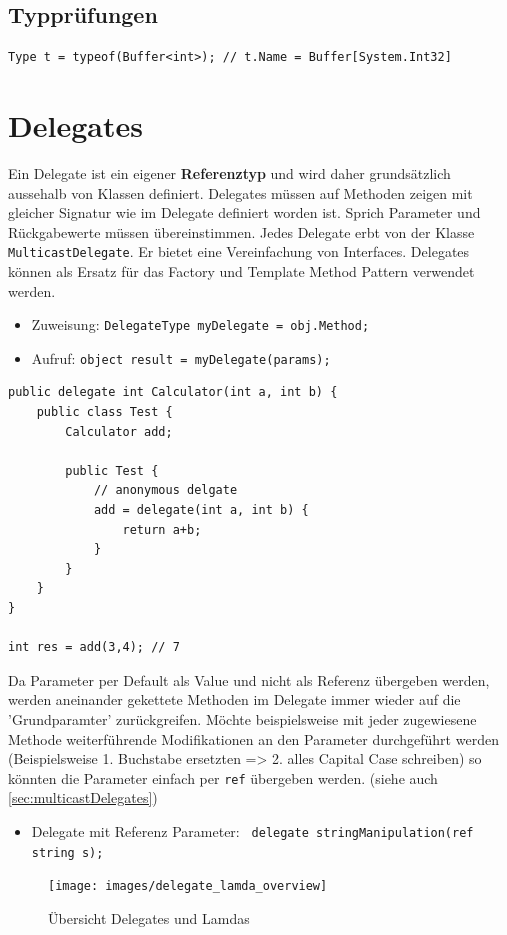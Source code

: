 \subsection{Typprüfungen}
\begin{lstlisting}
Type t = typeof(Buffer<int>); // t.Name = Buffer[System.Int32]
\end{lstlisting}


\section{Delegates}
Ein Delegate ist ein eigener \textbf{Referenztyp} und wird daher grundsätzlich aussehalb von Klassen definiert. Delegates müssen auf Methoden zeigen mit gleicher Signatur wie im Delegate definiert worden ist. Sprich Parameter und Rückgabewerte müssen übereinstimmen. Jedes Delegate erbt von der Klasse \lstinline|MulticastDelegate|. Er bietet eine Vereinfachung von Interfaces. Delegates können als Ersatz für das Factory und Template Method Pattern verwendet werden. 
\begin{itemize}
	\item Zuweisung: \lstinline|DelegateType myDelegate = obj.Method;|
	\item Aufruf: \lstinline|object result = myDelegate(params);|
\end{itemize}
\begin{lstlisting}
public delegate int Calculator(int a, int b) {
	public class Test {
		Calculator add;
		
		public Test {
			// anonymous delgate
			add = delegate(int a, int b) {
				return a+b;
			}
		}
	}
}

int res = add(3,4); // 7
\end{lstlisting}
Da Parameter per Default als Value und nicht als Referenz übergeben werden, werden aneinander gekettete Methoden im Delegate immer wieder auf die 'Grundparamter' zurückgreifen. Möchte beispielsweise mit jeder zugewiesene Methode weiterführende Modifikationen an den Parameter durchgeführt werden (Beispielsweise 1. Buchstabe ersetzten  => 2. alles Capital Case schreiben) so könnten die Parameter einfach per \lstinline|ref| übergeben werden. (siehe auch \ref{sec:multicastDelegates}) 
\begin{itemize}
	\item Delegate mit Referenz Parameter: \lstinline| delegate stringManipulation(ref string s);|
\end{itemize}

\begin{figure}[h]
	\centering
	\texttt{[image: images/delegate\_lamda\_overview]}
	\caption{Übersicht Delegates und Lamdas}
	\label{fig:delegatelamdaoverview}
\end{figure}

